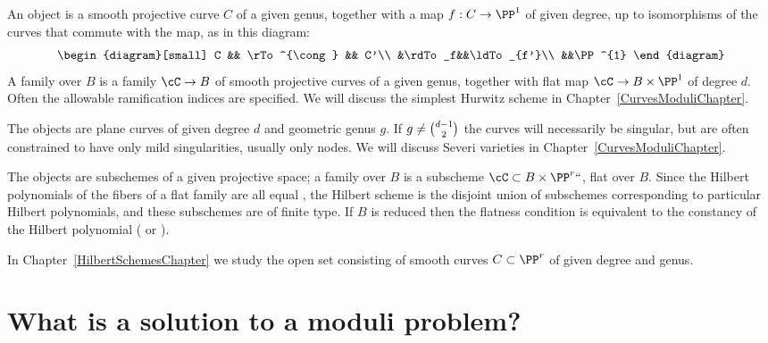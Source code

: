 \begin{example} An object is a smooth projective curve $C$
%
of a given genus, together with a map $f: C\to \PP^1$ of given degree, up
to isomorphisms of the curves that commute with the map, as in this diagram:
$$
\begin{diagram}[small]
C && \rTo^{\cong} && C'\\
&\rdTo_f&&\ldTo_{f'}\\
&&\PP^{1}
\end{diagram}
$$
A family over $B$ is a family $\cC \to B$ of smooth projective curves
of a given genus, together with flat map $\cC \to B\times \PP^{1}$
of degree $d$.
 Often the allowable ramification indices are specified. We will discuss
 the simplest Hurwitz scheme in Chapter~\ref{CurvesModuliChapter}.
\end{example}

\begin{example} The objects are plane curves
%
\label{Severi}%
of given degree $d$ and geometric genus $g$. If $g \neq \tbinom{d-1}{ 2}$
the curves will necessarily be singular, but are often
constrained to have only mild singularities, usually only nodes. We will
discuss
Severi varieties
in Chapter~\ref{CurvesModuliChapter}.
\end{example}

\begin{example} The objects are subschemes of a given
%
projective space;   a family over $B$ is a subscheme $\cC \subset B \times
\PP^r` `$, flat over $B$. Since the Hilbert polynomials of the fibers
of a
flat family
%
are all equal
\cite[Chapter III, \S9]{Hartshorne1977},
the Hilbert scheme is the disjoint union of subschemes corresponding to
particular Hilbert polynomials, and these subschemes are of finite type.
%
If $B$ is reduced then the flatness condition is equivalent to the
constancy of the Hilbert polynomial (\cite[Theorem 9.9]{Hartshorne1977} or \cite[Chapter III, \S 3.2]{DE-JH-schemes}).

In Chapter~\ref{HilbertSchemesChapter} we
study the
open set consisting of smooth curves $C\subset \PP^{r}$ of given degree
and genus.
\end{example}

\section{What is a solution to a moduli problem?}

